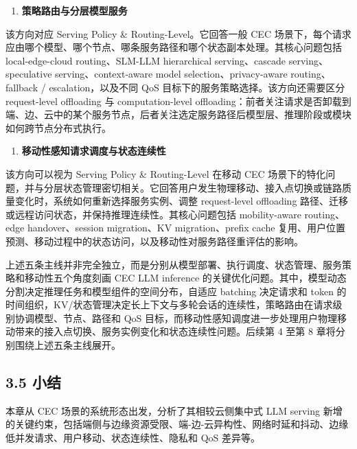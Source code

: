 \documentclass[a4paper,10pt]{ctexart}
\begin{document}
\begin{enumerate}
\item \textbf{策略路由与分层模型服务}

\end{enumerate}
该方向对应 Serving Policy \& Routing-Level。它回答一般 CEC 场景下，每个请求应由哪个模型、哪个节点、哪条服务路径和哪个状态副本处理。其核心问题包括 local-edge-cloud routing、SLM-LLM hierarchical serving、cascade serving、speculative serving、context-aware model selection、privacy-aware routing、fallback / escalation，以及不同 QoS 目标下的服务策略选择。该方向还需要区分 request-level offloading 与 computation-level offloading：前者关注请求是否卸载到端、边、云中的某个服务节点，后者关注选定服务路径后模型层、推理阶段或模块如何跨节点分布式执行。


\begin{enumerate}
\item \textbf{移动性感知请求调度与状态连续性}

\end{enumerate}
该方向可以视为 Serving Policy \& Routing-Level 在移动 CEC 场景下的特化问题，并与分层状态管理密切相关。它回答用户发生物理移动、接入点切换或链路质量变化时，系统如何重新选择服务实例、调整 request-level offloading 路径、迁移或远程访问状态，并保持推理连续性。其核心问题包括 mobility-aware routing、edge handover、session migration、KV migration、prefix cache 复用、用户位置预测、移动过程中的状态访问，以及移动性对服务路径重评估的影响。




上述五条主线并非完全独立，而是分别从模型部署、执行调度、状态管理、服务策略和移动性五个角度刻画 CEC LLM inference 的关键优化问题。其中，模型动态分割决定推理任务和模型组件的空间分布，自适应 batching 决定请求和 token 的时间组织，KV/状态管理决定长上下文与多轮会话的连续性，策略路由在请求级别协调模型、节点、路径和 QoS 目标，而移动性感知调度进一步处理用户物理移动带来的接入点切换、服务实例变化和状态连续性问题。后续第 4 至第 8 章将分别围绕上述五条主线展开。








\subsection*{3.5 小结}



本章从 CEC 场景的系统形态出发，分析了其相较云侧集中式 LLM serving 新增的关键约束，包括端侧与边缘资源受限、端-边-云异构性、网络时延和抖动、边缘低并发请求、用户移动、状态连续性、隐私和 QoS 差异等。
\end{document}
